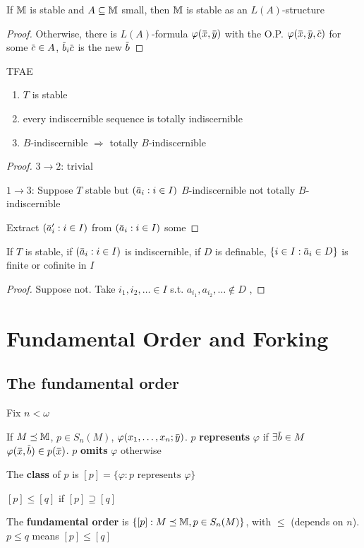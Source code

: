 \documentclass[11pt]{article}
\begin{document}
\begin{proposition}[]
If \(\mathbb{M}\) is stable and \(A\subseteq\mathbb{M}\) small, then \(\mathbb{M}\) is stable as an \(L(A)\)-structure
\end{proposition}

\begin{proof}
Otherwise, there is \(L(A)\)-formula \(\varphi(\barx,\bary)\) with the O.P.
\(\varphi(\barx,\bary,\barc)\) for some \(\barc\in A\), \(\barb_i\barc\) is the new \(\barb\)
\end{proof}

\begin{theorem}[]
TFAE
\begin{enumerate}
\item \(T\) is stable
\item every indiscernible sequence is totally indiscernible
\item \(B\)-indiscernible \(\Rightarrow\) totally \(B\)-indiscernible
\end{enumerate}
\end{theorem}

\begin{proof}
\(3\to 2\): trivial

\(1\to 3\): Suppose \(T\) stable but \((\bara_i:i\in I)\) \(B\)-indiscernible not
totally \(B\)-indiscernible

Extract \((\bara_i':i\in I)\) from \((\bara_i:i\in I)\) some
\end{proof}

\begin{corollary}[]
If \(T\) is stable, if \((\bara_i:i\in I)\) is indiscernible, if \(D\) is
definable, \(\{i\in I:\bara_i\in D\}\) is finite or cofinite in \(I\)
\end{corollary}

\begin{proof}
Suppose not. Take \(i_1,i_2,\dots\in I\) s.t. \(a_{i_1},a_{i_2},\dots\notin D\) , 
\end{proof}


\section{Fundamental Order and Forking}
\label{sec:org98287d7}
\subsection{The fundamental order}
\label{sec:org4d94368}
Fix \(n<\omega\)
\begin{definition}[]
If \(M\preceq\mathbb{M}\), \(p\in S_n(M)\), \(\varphi(x_1,\dots,x_n;\bary)\). \(p\) \textbf{represents} \(\varphi\)
if \(\exists\barb\in M\) \(\varphi(\barx,\barb)\in p(\barx)\). \(p\) \textbf{omits} \(\varphi\) otherwise

The \textbf{class} of \(p\) is \([p]=\{\varphi:p\text{ represents }\varphi\}\)

\([p]\le[q]\) if \([p]\supseteq[q]\)

The \textbf{fundamental order} is \(\{[p]:M\preceq\mathbb{M},p\in S_n(M)\}\), with \(\le\) (depends on \(n\)). \(p\le q\) means \([p]\le[q]\)
\end{definition}
\end{document}
